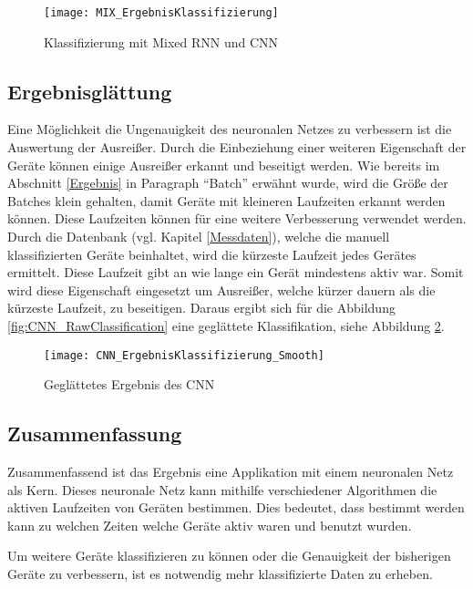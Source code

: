        \begin{figure}[H]
            \centering
            \texttt{[image: MIX\_ErgebnisKlassifizierung]}
            \caption{Klassifizierung mit Mixed RNN und CNN}
            \label{fig:MIX_RawClassification}
        \end{figure}

    \subsection{Ergebnisglättung}
        Eine Möglichkeit die Ungenauigkeit des neuronalen Netzes zu verbessern ist die Auswertung der Ausreißer.
        Durch die Einbeziehung einer weiteren Eigenschaft der Geräte können einige Ausreißer erkannt und beseitigt werden.
        Wie bereits im Abschnitt \ref{Ergebnis} in Paragraph "`Batch"' erwähnt wurde, wird die Größe der Batches klein gehalten, damit Geräte mit kleineren Laufzeiten erkannt werden können.
        Diese Laufzeiten können für eine weitere Verbesserung verwendet werden.
        Durch die Datenbank (vgl. Kapitel \ref{Messdaten}), welche die manuell klassifizierten Geräte beinhaltet, wird die kürzeste Laufzeit jedes Gerätes ermittelt.
        Diese Laufzeit gibt an wie lange ein Gerät mindestens aktiv war.
        Somit wird diese Eigenschaft eingesetzt um Ausreißer, welche kürzer dauern als die kürzeste Laufzeit, zu beseitigen.
        Daraus ergibt sich für die Abbildung \ref{fig:CNN_RawClassification} eine geglättete Klassifikation, siehe Abbildung \ref{fig:CNN_SmoothClassification}.

        \begin{figure}[H]
            \centering
            \texttt{[image: CNN\_ErgebnisKlassifizierung\_Smooth]}
            \caption{Geglättetes Ergebnis des CNN}
            \label{fig:CNN_SmoothClassification}
        \end{figure}
    
    \subsection{Zusammenfassung}
        Zusammenfassend ist das Ergebnis eine Applikation mit einem neuronalen Netz als Kern. 
        Dieses neuronale Netz kann mithilfe verschiedener Algorithmen die aktiven Laufzeiten von Geräten bestimmen.
        Dies bedeutet, dass bestimmt werden kann zu welchen Zeiten welche Geräte aktiv waren und benutzt wurden.
        
        Um weitere Geräte klassifizieren zu können oder die Genauigkeit der bisherigen Geräte zu verbessern, ist es notwendig mehr klassifizierte Daten zu erheben.
